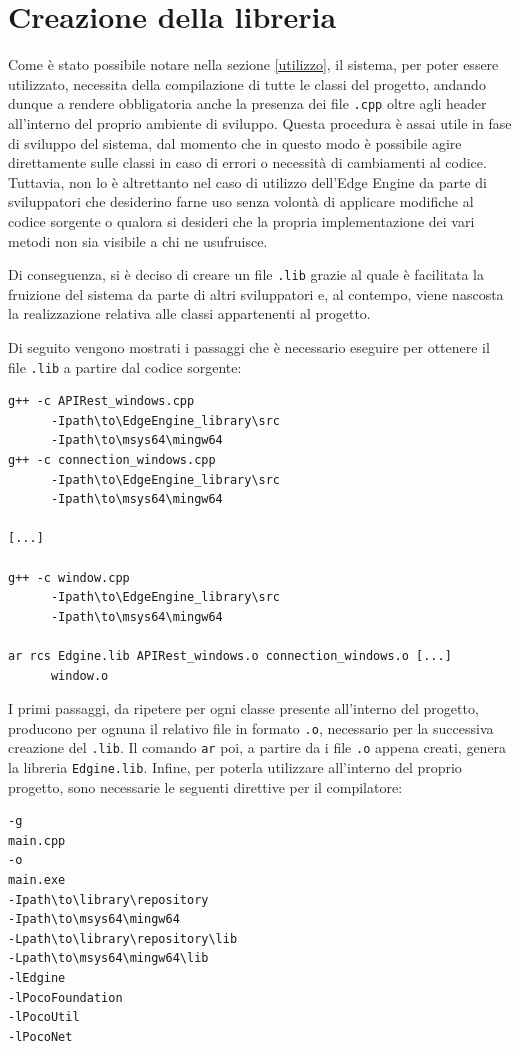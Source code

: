 \section{Creazione della libreria}
Come è stato possibile notare nella sezione \ref{utilizzo}, il sistema, per poter essere utilizzato, necessita della compilazione di tutte le classi del progetto, andando dunque a rendere obbligatoria anche la presenza dei file \texttt{.cpp} oltre agli header all'interno del proprio ambiente di sviluppo. Questa procedura è assai utile in fase di sviluppo del sistema, dal momento che in questo modo è possibile agire direttamente sulle classi in caso di errori o necessità di cambiamenti al codice. Tuttavia, non lo è altrettanto nel caso di utilizzo dell'Edge Engine da parte di sviluppatori che desiderino farne uso senza volontà di applicare modifiche al codice sorgente o qualora si desideri che la propria implementazione dei vari metodi non sia visibile a chi ne usufruisce.

Di conseguenza, si è deciso di creare un file \texttt{.lib} grazie al quale è facilitata la fruizione del sistema da parte di altri sviluppatori e, al contempo, viene nascosta la realizzazione relativa alle classi appartenenti al progetto.

Di seguito vengono mostrati i passaggi che è necessario eseguire per ottenere il file \texttt{.lib} a partire dal codice sorgente:

\begin{verbatim}
g++ -c APIRest_windows.cpp 
      -Ipath\to\EdgeEngine_library\src 
      -Ipath\to\msys64\mingw64 
g++ -c connection_windows.cpp 
      -Ipath\to\EdgeEngine_library\src 
      -Ipath\to\msys64\mingw64 

[...]

g++ -c window.cpp
      -Ipath\to\EdgeEngine_library\src 
      -Ipath\to\msys64\mingw64 
 
ar rcs Edgine.lib APIRest_windows.o connection_windows.o [...] 
      window.o
\end{verbatim}

I primi passaggi, da ripetere per ogni classe presente all'interno del progetto, producono per ognuna il relativo file in formato \texttt{.o}, necessario per la successiva creazione del \texttt{.lib}. Il comando \texttt{ar} poi, a partire da i file \texttt{.o} appena creati, genera la libreria \texttt{Edgine.lib}. Infine, per poterla utilizzare all'interno del proprio progetto, sono necessarie le seguenti direttive per il compilatore:

\begin{verbatim}
-g
main.cpp
-o
main.exe
-Ipath\to\library\repository
-Ipath\to\msys64\mingw64
-Lpath\to\library\repository\lib
-Lpath\to\msys64\mingw64\lib
-lEdgine
-lPocoFoundation
-lPocoUtil
-lPocoNet
\end{verbatim}








